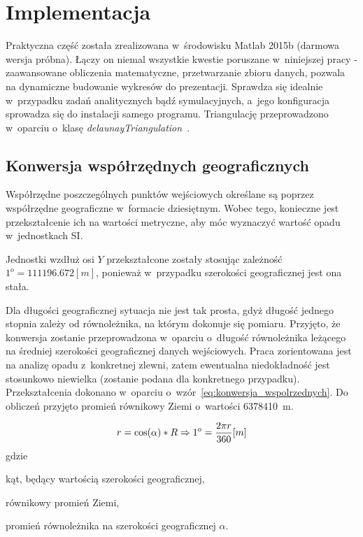 \chapter{Implementacja}
\label{cha:implementacja}

Praktyczna część została zrealizowana w~środowisku Matlab 2015b (darmowa wersja próbna). Łączy on niemal wszystkie kwestie poruszane w~niniejszej pracy - zaawansowane obliczenia matematyczne, przetwarzanie zbioru danych, pozwala na dynamiczne budowanie wykresów do prezentacji. Sprawdza się idealnie w~przypadku zadań analitycznych bądź symulacyjnych, a~jego konfiguracja sprowadza się do instalacji samego programu. Triangulację przeprowadzono w~oparciu o~klasę \textit{delaunayTriangulation}~\cite{delaunayTriangulation}.

\section{Konwersja współrzędnych geograficznych}
Współrzędne poszczególnych punktów wejściowych określane są poprzez współrzędne geograficzne w~formacie dziesiętnym. Wobec tego, konieczne jest przekształcenie ich na wartości metryczne, aby móc wyznaczyć wartość opadu w~jednostkach SI.

Jednostki wzdłuż osi $Y$ przekształcone zostały stosując zależność $1^o=111196.672 [m]$, ponieważ w~przypadku szerokości geograficznej jest ona stała.

Dla długości geograficznej sytuacja nie jest tak prosta, gdyż długość jednego stopnia zależy od równoleżnika, na którym dokonuje się pomiaru. Przyjęto, że konwersja zostanie przeprowadzona w~oparciu o~długość równoleżnika leżącego na średniej szerokości geograficznej danych wejściowych. Praca zorientowana jest na analizę opadu z~konkretnej zlewni, zatem ewentualna niedokładność jest stosunkowo niewielka (zostanie podana dla konkretnego przypadku). Przekształcenia dokonano w~oparciu o~wzór~\ref{eq:konwersja_wspolrzednych}. Do obliczeń przyjęto promień równikowy Ziemi o~wartości 6378410~m.

\begin{equation}
	r = \cos(\alpha)*R \Rightarrow 1^o = \frac{2 \pi r}{360} [m] \\
	\label{eq:konwersja_wspolrzednych}
\end{equation}
gdzie
\begin{description}[leftmargin=2cm, itemsep=0cm, labelsep=0cm]
	\item[$\alpha$] kąt, będący wartością szerokości geograficznej,
	\item[$R$] równikowy promień Ziemi,
	\item[$r$] promień równoleżnika na szerokości geograficznej $\alpha$.
\end{description}


